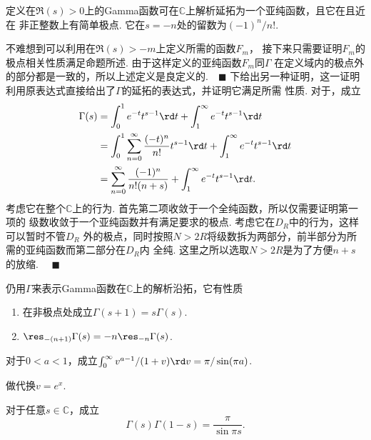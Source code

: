   \begin{thm}[Gamma函数的延拓]
    定义在$\Re(s)>0$上的Gamma函数可在$\mathbb{C}$上解析延拓为一个亚纯函数，且它在且近在
    非正整数上有简单极点. 它在$s=-n$处的留数为$(-1)^n/n!$.
  \end{thm}
  \proof
    不难想到可以利用在$\Re(s)>-m$上定义所需的函数$F_m$，
    接下来只需要证明$F_m$的极点相关性质满足命题所述. 由于这样定义的亚纯函数$F_m$同$\Gamma$
    在定义域内的极点外的部分都是一致的，所以上述定义是良定义的.$\quad\blacksquare$
  \proof
    下给出另一种证明，这一证明利用原表达式直接给出了$\Gamma$的延拓的表达式，并证明它满足所需
    性质. 对于，成立
    \[\begin{split}
      \Gamma(s) &= \int_0^1e^{-t}t^{s-1}\rd t + \int_1^\infty e^{-t}t^{s-1}\rd t \\
      &= \int_0^1\sum_{n=0}^\infty\frac{(-t)^n}{n!}t^{s-1}\rd t 
        + \int_1^\infty e^{-t}t^{s-1}\rd t \\
      &= \sum_{n=0}^\infty\frac{(-1)^n}{n!(n+s)}
        + \int_1^\infty e^{-t}t^{s-1}\rd t.
    \end{split}\]
    考虑它在整个$\mathbb{C}$上的行为. 首先第二项收敛于一个全纯函数，所以仅需要证明第一项的
    级数收敛于一个亚纯函数并有满足要求的极点. 考虑它在$D_R$中的行为，这样可以暂时不管$D_R$
    外的极点，同时按照$N>2R$将级数拆为两部分，前半部分为所需的亚纯函数而第二部分在$D_R$内
    全纯. 这里之所以选取$N>2R$是为了方便$n+s$的放缩. $\quad\blacksquare$

  \begin{pos}[沿拓的准周期性]
    仍用$\Gamma$来表示Gamma函数在$\mathbb{C}$上的解析沿拓，它有性质
    \begin{enumerate}
      \item 在非极点处成立$\Gamma(s+1)=s\Gamma(s)$.
      \item $\res_{-(n+1)}\Gamma(s)=-n\res_{-n}\Gamma(s)$.
    \end{enumerate}
  \end{pos}

  \begin{lemma}
    对于$0<a<1$，成立$\int_0^\infty v^{a-1}/(1+v)\rd v = \pi/\sin(\pi a)$.
  \end{lemma}
  \proof
    做代换$v=e^x$.

  \begin{thm}[Gamma函数的对称性]
    对于任意$s\in\mathbb{C}$，成立
    \[
      \Gamma(s)\Gamma(1-s) = \frac{\pi}{\sin\pi s}.
    \]
  \end{thm}
  

